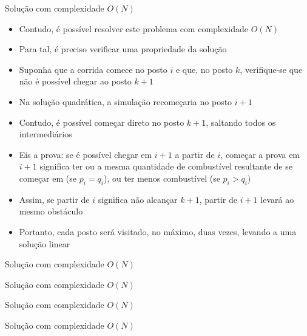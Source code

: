 \begin{frame}[fragile]{Solução com complexidade $O(N)$}

    \begin{itemize}
        \item Contudo, é possível resolver este problema com complexidade $O(N)$

        \item Para tal, é preciso verificar uma propriedade da solução 

        \item Suponha que a corrida comece no posto $i$ e que, no posto $k$, verifique-se que
            não é possível chegar ao posto $k + 1$

        \item Na solução quadrática, a simulação recomeçaria no posto $i + 1$

        \item Contudo, é possível começar direto no posto $k + 1$, saltando todos os intermediários

        \item Eis a prova: se é possível chegar em $i + 1$ a partir de $i$, começar a prova em
            $i + 1$ significa ter ou a mesma quantidade de combustível resultante de se 
            começar em (se $p_i = q_i$), ou ter menos combustível (se $p_i > q_i$)

        \item Assim, se partir de $i$ significa não alcançar $k + 1$, partir de $i + 1$ levará ao
            mesmo obstáculo

        \item Portanto, cada posto será visitado, no máximo, duas vezes, levando a uma solução
            linear
    \end{itemize}

\end{frame}

\begin{frame}[fragile]{Solução com complexidade $O(N)$}
\end{frame}

\begin{frame}[fragile]{Solução com complexidade $O(N)$}
\end{frame}

\begin{frame}[fragile]{Solução com complexidade $O(N)$}
\end{frame}

\begin{frame}[fragile]{Solução com complexidade $O(N)$}
\end{frame}

